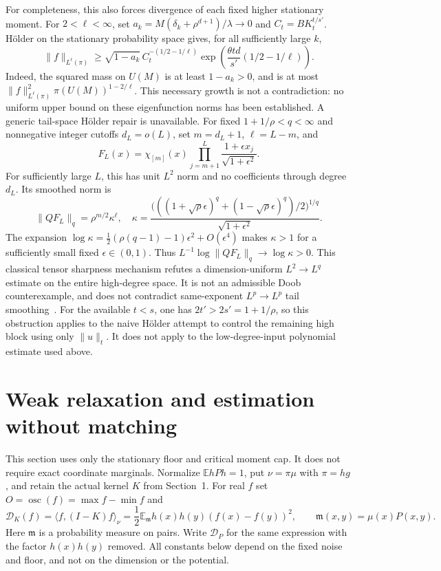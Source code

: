 \documentclass[11pt]{article}
\newcommand{\E}{\mathbb E}
\begin{document}
For completeness, this also forces divergence of each fixed higher
stationary moment. For $2<\ell<\infty$, set
$a_k=M(\delta_k+\rho^{d+1})/\lambda\to0$ and
$C_t=BK_t^{t/s'}$. H\"older on the stationary probability space gives,
for all sufficiently large $k$,
\[
 \|f\|_{L^\ell(\pi)}\ge
 \sqrt{1-a_k}\,C_t^{-(1/2-1/\ell)}
 \exp\!\left(\frac{\theta td}{s'}(1/2-1/\ell)\right).
\]
Indeed, the squared mass on $U(M)$ is at least $1-a_k>0$, and is at
most $\|f\|_{L^\ell(\pi)}^2\pi(U(M))^{1-2/\ell}$.
This necessary growth is not a contradiction: no uniform upper bound
on these eigenfunction norms has been established.
A generic tail-space H\"older repair is unavailable. For fixed
$1+1/\rho<q<\infty$ and nonnegative integer cutoffs $d_L=o(L)$, set $m=d_L+1$, $\ell=L-m$, and
\[
 F_L(x)=\chi_{[m]}(x)\prod_{j=m+1}^{L}
       \frac{1+\epsilon x_j}{\sqrt{1+\epsilon^2}}.
\]
For sufficiently large $L$, this has unit $L^2$ norm and no coefficients
through degree $d_L$. Its smoothed norm is
\[
 \|QF_L\|_q=\rho^{m/2}\kappa^\ell,\quad
 \kappa=\frac{\bigl(((1+\sqrt\rho\epsilon)^q+
 (1-\sqrt\rho\epsilon)^q)/2\bigr)^{1/q}}{\sqrt{1+\epsilon^2}}.
\]
The expansion $\log\kappa=\tfrac12(\rho(q-1)-1)\epsilon^2+
O(\epsilon^4)$ makes $\kappa>1$ for a sufficiently small fixed
$\epsilon\in(0,1)$. Thus $L^{-1}\log\|QF_L\|_q\to\log\kappa>0$.
This classical tensor sharpness mechanism refutes a dimension-uniform
$L^2\to L^q$ estimate on the entire high-degree space. It is not an
admissible Doob counterexample, and does not contradict same-exponent
$L^p\to L^p$ tail smoothing~\cite{hmo,volberg}. For the available $t<s$, one has $2t'>2s'=1+1/\rho$, so this obstruction applies to the naive H\"older attempt to control the remaining high block using only $\|u\|_t$. It does not apply to the low-degree-input polynomial estimate used above.


\section{Weak relaxation and estimation without matching}\label{weakrelaxation}
This section uses only the stationary floor and critical moment cap.
It does not require exact coordinate marginals. Normalize $\E hPh=1$,
put $\nu=\pi\mu$ with $\pi=hg$, and retain the actual kernel $K$ from
Section~1. For real $f$ set $O=\operatorname{osc}(f)=\max f-\min f$ and
\[
 \mathcal D_K(f)=\langle f,(I-K)f\rangle_\nu
 =\frac12\E_{\mathfrak m}
       h(x)h(y)(f(x)-f(y))^2,\qquad
 \mathfrak m(x,y)=\mu(x)P(x,y).
\]
Here $\mathfrak m$ is a probability measure on pairs. Write $\mathcal D_P$
for the same expression with the factor $h(x)h(y)$ removed. All constants
below depend on the fixed noise and floor, and not on the dimension or
the potential.
\end{document}
